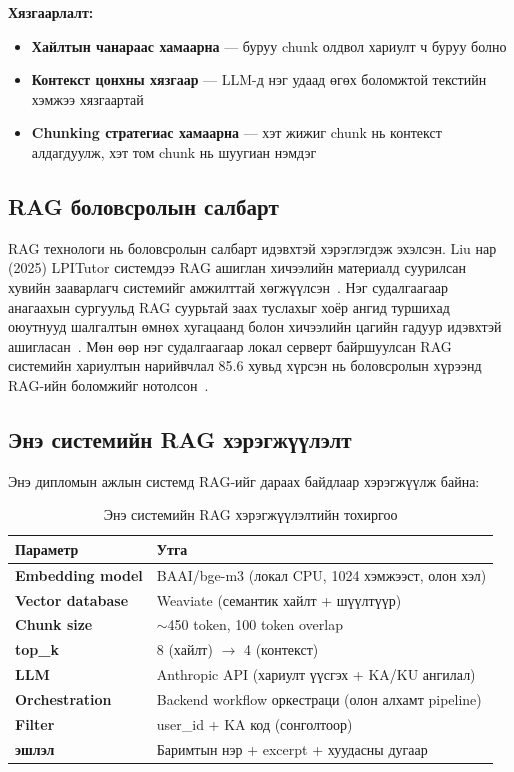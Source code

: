 \documentclass[12pt,A4]{report}
\begin{document}
\textbf{Хязгаарлалт:}

\begin{itemize}
    \item \textbf{Хайлтын чанараас хамаарна} --- буруу chunk олдвол хариулт ч буруу болно
    \item \textbf{Контекст цонхны хязгаар} --- LLM-д нэг удаад өгөх боломжтой текстийн хэмжээ хязгаартай
    \item \textbf{Chunking стратегиас хамаарна} --- хэт жижиг chunk нь контекст алдагдуулж, хэт том chunk нь шуугиан нэмдэг
\end{itemize}

\subsection{RAG боловсролын салбарт}

RAG технологи нь боловсролын салбарт идэвхтэй хэрэглэгдэж эхэлсэн. Liu нар (2025) LPITutor системдээ RAG ашиглан хичээлийн материалд суурилсан хувийн зааварлагч системийг амжилттай хөгжүүлсэн~\cite{liu2025}. Нэг судалгаагаар анагаахын сургуульд RAG суурьтай заах туслахыг хоёр ангид туршихад оюутнууд шалгалтын өмнөх хугацаанд болон хичээлийн цагийн гадуур идэвхтэй ашигласан~\cite{nature2025}. Мөн өөр нэг судалгаагаар локал серверт байршуулсан RAG системийн хариултын нарийвчлал 85.6 хувьд хүрсэн нь боловсролын хүрээнд RAG-ийн боломжийг нотолсон~\cite{mdpi2025}.

\subsection{Энэ системийн RAG хэрэгжүүлэлт}

Энэ дипломын ажлын системд RAG-ийг дараах байдлаар хэрэгжүүлж байна:

\begin{table}[h!]
\centering
\caption{Энэ системийн RAG хэрэгжүүлэлтийн тохиргоо}
\label{tab:our_rag}
\begin{tabularx}{\textwidth}{>{\bfseries}l X}
\toprule
\textbf{Параметр} & \textbf{Утга} \\
\midrule
\rowcolor{lightbg}
Embedding model & BAAI/bge-m3 (локал CPU, 1024 хэмжээст, олон хэл) \\
Vector database & Weaviate (семантик хайлт + шүүлтүүр) \\
\rowcolor{lightbg}
Chunk size & $\sim$450 token, 100 token overlap \\
top\_k & 8 (хайлт) $\rightarrow$ 4 (контекст) \\
\rowcolor{lightbg}
LLM & Anthropic API (хариулт үүсгэх + KA/KU ангилал) \\
Orchestration & Backend workflow оркестраци (олон алхамт pipeline) \\
\rowcolor{lightbg}
Filter & user\_id + KA код (сонголтоор) \\
эшлэл & Баримтын нэр + excerpt + хуудасны дугаар \\
\bottomrule
    \end{tabularx}
\end{table}
\end{document}
